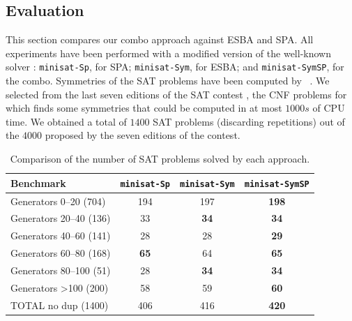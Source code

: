 \subsection{Evaluation}
This section compares our combo approach against ESBA and SPA. All experiments
have been performed with a modified version of the well-known \minisat{} solver \cite{een2003extensible}: \texttt{minisat-Sp}, for
SPA; \texttt{minisat-Sym}, for ESBA; and \texttt{minisat-SymSP}, for the
combo. Symmetries of the SAT problems have been computed by
\bliss{}~\cite{JunttilaKaski:ALENEX2007}.
We selected from the last seven editions of the SAT contest
\cite{jarvisalo2012international}, the CNF problems for which \bliss{} finds
some symmetries that could be computed in at most $1000s$ of CPU time. We
obtained a total of $1400$ SAT problems (discarding repetitions) out of the
$4000$ proposed by the seven editions of the contest.
\begin{table}\footnotesize
 \centering
 \begin{tabular}{l|ccc}
  \toprule
  Benchmark  &\texttt{minisat-Sp} & \texttt{minisat-Sym} & \texttt{minisat-SymSP}\\
  \hline 
  Generators 0–20 (704) & 194&197&\cellcolor{gray!30,}\textbf{198}\\
  Generators 20–40 (136) & 33&\cellcolor{gray!30}\textbf{34}&\cellcolor{gray!30}\textbf{34}\\
  Generators 40–60 (141) & 28&28&\cellcolor{gray!30}\textbf{29}\\
  Generators 60–80 (168) & \cellcolor{gray!30}\textbf{65}&64&\cellcolor{gray!30}\textbf{65}\\
  Generators 80–100 (51) & 28&\cellcolor{gray!30}\textbf{34}&\cellcolor{gray!30}\textbf{34}\\
  Generators  \textgreater100 (200) & 58&59&\cellcolor{gray!30}\textbf{60}\\
  \hline 
  TOTAL no dup (1400) & 406 & 416 & \cellcolor{gray!30,}\textbf{420}\\
  \bottomrule
 \end{tabular}
 \caption{Comparison of the number of SAT problems solved by each approach.}
 \label{tab:sat}
\end{table}

